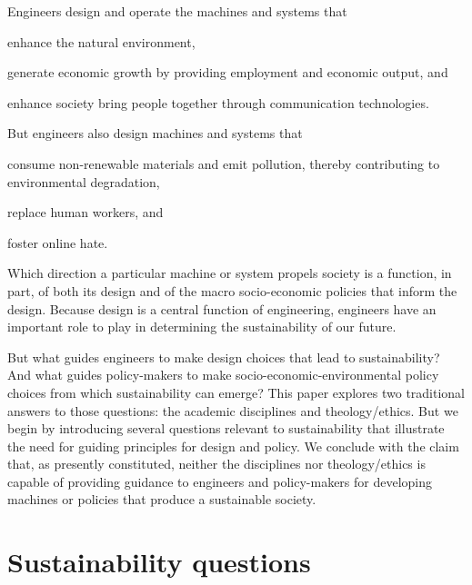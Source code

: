 \documentclass[12pt]{article}
\begin{document}
Engineers design and operate the machines and systems that
%
\begin{enumerate*}[label={(\alph*)}]

  \item enhance the natural environment,

  \item generate economic growth by providing employment and economic output, and

  \item enhance society bring people together through communication technologies.

\end{enumerate*}
%
But engineers also design machines and systems that
%
\begin{enumerate*}[label={(\alph*)}]

  \item consume non-renewable materials and
        emit pollution, thereby contributing to environmental degradation,

  \item replace human workers, and

  \item foster online hate.        

\end{enumerate*}
%
Which direction a particular machine or system propels society is a function, in part,
of both its design and of the macro socio-economic policies that inform the design.
Because design is a central function of engineering, 
engineers have an important role to play in determining 
the sustainability of our future. 

But what guides engineers to make design choices that lead to sustainability?
And what guides policy-makers to make socio-economic-environmental
policy choices from which sustainability can emerge?
This paper explores two traditional answers to those questions:
the academic disciplines and theology/ethics.
But we begin by introducing several questions relevant to sustainability
that illustrate the need for guiding principles for design and policy.
We conclude with the claim that, as presently constituted, 
neither the disciplines nor theology/ethics is capable of providing
guidance to engineers and policy-makers
for developing machines or policies that 
produce a sustainable society.


\section{Sustainability questions}
\label{sec:sustainability_questions}
\end{document}
